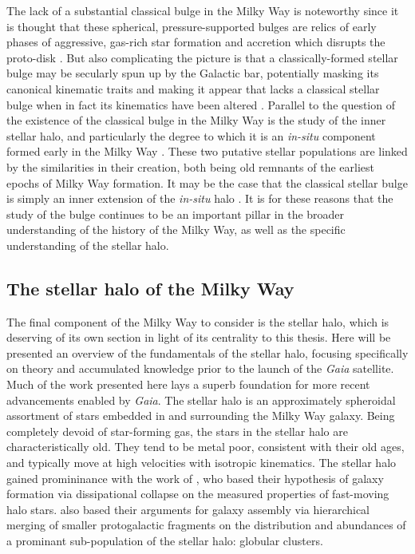 The lack of a substantial classical bulge in the Milky Way is noteworthy since it is thought that these spherical, pressure-supported bulges are relics of early phases of aggressive, gas-rich star formation and accretion which disrupts the proto-disk \parencite{steinmetz95,samland03,obreja13}. But also complicating the picture is that a classically-formed stellar bulge may be secularly spun up by the Galactic bar, potentially masking its canonical kinematic traits and making it appear that lacks a classical stellar bulge when in fact its kinematics have been altered \parencite{saha12}. Parallel to the question of the existence of the classical bulge in the Milky Way is the study of the inner stellar halo, and particularly the degree to which it is an \textit{in-situ} component formed early in the Milky Way \parencite[e.g.][]{rix22}. These two putative stellar populations are linked by the similarities in their creation, both being old remnants of the earliest epochs of Milky Way formation. It may be the case that the classical stellar bulge is simply an inner extension of the \textit{in-situ} halo \parencite{perez-villegas17}. It is for these reasons that the study of the bulge continues to be an important pillar in the broader understanding of the history of the Milky Way, as well as the specific understanding of the stellar halo.


\subsection{The stellar halo of the Milky Way}

The final component of the Milky Way to consider is the stellar halo, which is deserving of its own section in light of its centrality to this thesis. Here will be presented an overview of the fundamentals of the stellar halo, focusing specifically on theory and accumulated knowledge prior to the launch of the \textit{Gaia} satellite. Much of the work presented here lays a superb foundation for more recent advancements enabled by \textit{Gaia}. The stellar halo is an approximately spheroidal assortment of stars embedded in and surrounding the Milky Way galaxy. Being completely devoid of star-forming gas, the stars in the stellar halo are characteristically old. They tend to be metal poor, consistent with their old ages, and typically move at high velocities with isotropic kinematics. The stellar halo gained promininance with the work of \textcite{eggen62}, who based their hypothesis of galaxy formation via dissipational collapse on the measured properties of fast-moving halo stars. \textcite{searle78} also based their arguments for galaxy assembly via hierarchical merging of smaller protogalactic fragments on the distribution and abundances of a prominant sub-population of the stellar halo: globular clusters. 

